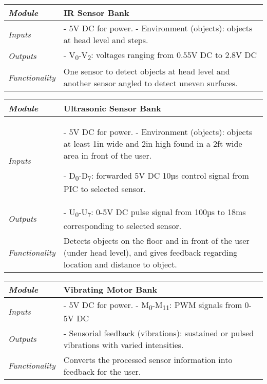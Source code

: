 \begin{table}
\begin{tabular}{|m{2cm}|m{10cm}|} \\ \hline
\emph{Module} & IR Sensor Bank \\ \hline
\emph{Inputs} & - 5V DC for power. 
- Environment (objects): objects at head level and steps. \\ \hline
\emph{Outputs} & - V\textsubscript{0}-V\textsubscript{2}: voltages ranging from 0.55V DC to 2.8V DC \\ \hline
\emph{Functionality} & One sensor to detect objects at head level and
another sensor angled to detect uneven surfaces. \\ \hline
\end{tabular}
\end{table}

\begin{table}
\begin{tabular}{|m{2cm}|m{10cm}|} \\ \hline
\emph{Module} & Ultrasonic Sensor Bank \\ \hline
\emph{Inputs} & - 5V DC for power.
- Environment (objects): objects at least 1in wide and 2in high found in
a 2ft wide area in front of the user.

- D\textsubscript{0}-D\textsubscript{7}: forwarded 5V DC 10µs control
signal from PIC to selected sensor. \\ \hline
\emph{Outputs} & - U\textsubscript{0}-U\textsubscript{7}: 0-5V DC pulse
signal from 100µs to 18ms corresponding to selected sensor. \\ \hline
\emph{Functionality} & Detects objects on the floor and in front of the
user (under head level), and gives feedback regarding location and
distance to object. \\ \hline
\end{tabular}
\end{table}

\begin{table}
\begin{tabular}{|m{2cm}|m{10cm}|} \\ \hline
\emph{Module} & Vibrating Motor Bank \\ \hline
\emph{Inputs} & - 5V DC for power.
- M\textsubscript{0}-M\textsubscript{11}: PWM signals from 0-5V DC \\ \hline
\emph{Outputs} & - Sensorial feedback (vibrations): sustained or pulsed
vibrations with varied intensities. \\ \hline
\emph{Functionality} & Converts the processed sensor information into
feedback for the user. \\ \hline
\end{tabular}
\end{table}

